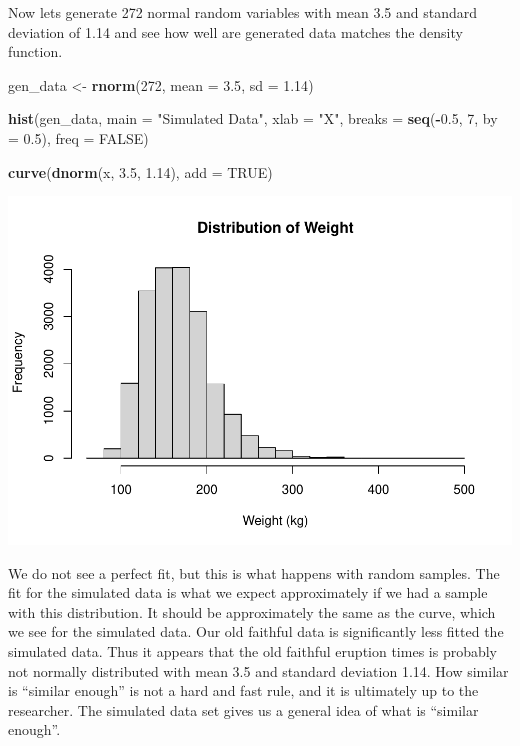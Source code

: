 \documentclass[
]{book}
\newenvironment{Shaded}{\begin{snugshade}}{\end{snugshade}}
\newcommand{\DataTypeTok}[1]{\textcolor[rgb]{0.13,0.29,0.53}{#1}}
\newcommand{\DecValTok}[1]{\textcolor[rgb]{0.00,0.00,0.81}{#1}}
\newcommand{\FloatTok}[1]{\textcolor[rgb]{0.00,0.00,0.81}{#1}}
\newcommand{\KeywordTok}[1]{\textcolor[rgb]{0.13,0.29,0.53}{\textbf{#1}}}
\newcommand{\NormalTok}[1]{#1}
\newcommand{\OperatorTok}[1]{\textcolor[rgb]{0.81,0.36,0.00}{\textbf{#1}}}
\newcommand{\OtherTok}[1]{\textcolor[rgb]{0.56,0.35,0.01}{#1}}
\newcommand{\StringTok}[1]{\textcolor[rgb]{0.31,0.60,0.02}{#1}}
\begin{document}
Now lets generate 272 normal random variables with mean 3.5 and standard deviation of 1.14 and see how well are generated data matches the density function.

\begin{Shaded}
\begin{Highlighting}[]
\NormalTok{gen_data <-}\StringTok{ }\KeywordTok{rnorm}\NormalTok{(}\DecValTok{272}\NormalTok{, }\DataTypeTok{mean =} \FloatTok{3.5}\NormalTok{, }\DataTypeTok{sd =} \FloatTok{1.14}\NormalTok{)}

\KeywordTok{hist}\NormalTok{(gen_data, }\DataTypeTok{main =} \StringTok{"Simulated Data"}\NormalTok{, }\DataTypeTok{xlab =} \StringTok{"X"}\NormalTok{, }\DataTypeTok{breaks =} \KeywordTok{seq}\NormalTok{(}\OperatorTok{-}\FloatTok{0.5}\NormalTok{,}
    \DecValTok{7}\NormalTok{, }\DataTypeTok{by =} \FloatTok{0.5}\NormalTok{), }\DataTypeTok{freq =} \OtherTok{FALSE}\NormalTok{)}

\KeywordTok{curve}\NormalTok{(}\KeywordTok{dnorm}\NormalTok{(x, }\FloatTok{3.5}\NormalTok{, }\FloatTok{1.14}\NormalTok{), }\DataTypeTok{add =} \OtherTok{TRUE}\NormalTok{)}
\end{Highlighting}
\end{Shaded}

\includegraphics{_main_files/figure-latex/unnamed-chunk-225-1.pdf}

We do not see a perfect fit, but this is what happens with random samples. The fit for the simulated data is what we expect approximately if we had a sample with this distribution. It should be approximately the same as the curve, which we see for the simulated data. Our old faithful data is significantly less fitted the simulated data. Thus it appears that the old faithful eruption times is probably not normally distributed with mean 3.5 and standard deviation 1.14. How similar is ``similar enough'' is not a hard and fast rule, and it is ultimately up to the researcher. The simulated data set gives us a general idea of what is ``similar enough''.
\end{document}
